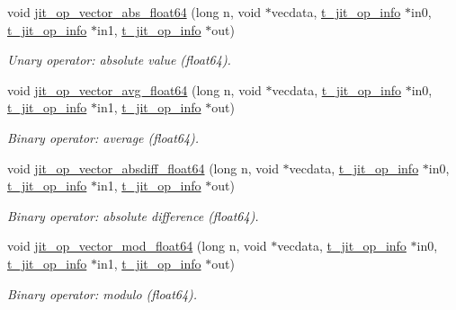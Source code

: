 \begin{DoxyCompactItemize}
void \hyperlink{group__opvecmod_ga0e650f8993bb50aa1ad6761d40925ad0}{jit\_\-op\_\-vector\_\-abs\_\-float64} (long n, void $\ast$vecdata, \hyperlink{structt__jit__op__info}{t\_\-jit\_\-op\_\-info} $\ast$in0, \hyperlink{structt__jit__op__info}{t\_\-jit\_\-op\_\-info} $\ast$in1, \hyperlink{structt__jit__op__info}{t\_\-jit\_\-op\_\-info} $\ast$out)
\begin{DoxyCompactList}\small\item\em Unary operator: absolute value (float64). \item\end{DoxyCompactList}\item 
void \hyperlink{group__opvecmod_gabc934a68c0591042bf2d2fccd5847f78}{jit\_\-op\_\-vector\_\-avg\_\-float64} (long n, void $\ast$vecdata, \hyperlink{structt__jit__op__info}{t\_\-jit\_\-op\_\-info} $\ast$in0, \hyperlink{structt__jit__op__info}{t\_\-jit\_\-op\_\-info} $\ast$in1, \hyperlink{structt__jit__op__info}{t\_\-jit\_\-op\_\-info} $\ast$out)
\begin{DoxyCompactList}\small\item\em Binary operator: average (float64). \item\end{DoxyCompactList}\item 
void \hyperlink{group__opvecmod_ga237b6d40cedfb2768fd1632dae8f234b}{jit\_\-op\_\-vector\_\-absdiff\_\-float64} (long n, void $\ast$vecdata, \hyperlink{structt__jit__op__info}{t\_\-jit\_\-op\_\-info} $\ast$in0, \hyperlink{structt__jit__op__info}{t\_\-jit\_\-op\_\-info} $\ast$in1, \hyperlink{structt__jit__op__info}{t\_\-jit\_\-op\_\-info} $\ast$out)
\begin{DoxyCompactList}\small\item\em Binary operator: absolute difference (float64). \item\end{DoxyCompactList}\item 
void \hyperlink{group__opvecmod_gabd1f654ed99061d886bd768c80493a54}{jit\_\-op\_\-vector\_\-mod\_\-float64} (long n, void $\ast$vecdata, \hyperlink{structt__jit__op__info}{t\_\-jit\_\-op\_\-info} $\ast$in0, \hyperlink{structt__jit__op__info}{t\_\-jit\_\-op\_\-info} $\ast$in1, \hyperlink{structt__jit__op__info}{t\_\-jit\_\-op\_\-info} $\ast$out)
\begin{DoxyCompactList}\small\item\em Binary operator: modulo (float64). \item\end{DoxyCompactList}\item 

\end{DoxyCompactItemize}
